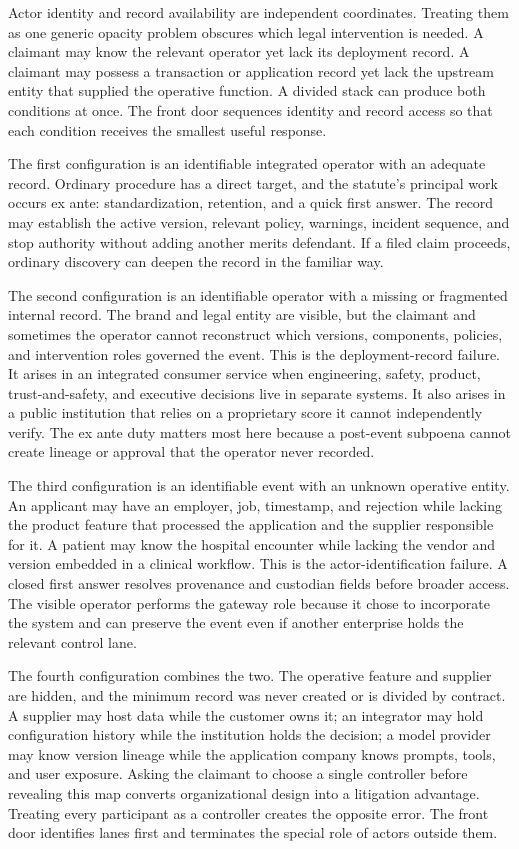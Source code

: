 Actor identity and record availability are independent coordinates. Treating them as one generic opacity problem obscures which legal intervention is needed. A claimant may know the relevant operator yet lack its deployment record. A claimant may possess a transaction or application record yet lack the upstream entity that supplied the operative function. A divided stack can produce both conditions at once. The front door sequences identity and record access so that each condition receives the smallest useful response.

The first configuration is an identifiable integrated operator with an adequate record. Ordinary procedure has a direct target, and the statute's principal work occurs ex ante: standardization, retention, and a quick first answer. The record may establish the active version, relevant policy, warnings, incident sequence, and stop authority without adding another merits defendant. If a filed claim proceeds, ordinary discovery can deepen the record in the familiar way.

The second configuration is an identifiable operator with a missing or fragmented internal record. The brand and legal entity are visible, but the claimant and sometimes the operator cannot reconstruct which versions, components, policies, and intervention roles governed the event. This is the deployment-record failure. It arises in an integrated consumer service when engineering, safety, product, trust-and-safety, and executive decisions live in separate systems. It also arises in a public institution that relies on a proprietary score it cannot independently verify. The ex ante duty matters most here because a post-event subpoena cannot create lineage or approval that the operator never recorded.

The third configuration is an identifiable event with an unknown operative entity. An applicant may have an employer, job, timestamp, and rejection while lacking the product feature that processed the application and the supplier responsible for it. A patient may know the hospital encounter while lacking the vendor and version embedded in a clinical workflow. This is the actor-identification failure. A closed first answer resolves provenance and custodian fields before broader access. The visible operator performs the gateway role because it chose to incorporate the system and can preserve the event even if another enterprise holds the relevant control lane.

The fourth configuration combines the two. The operative feature and supplier are hidden, and the minimum record was never created or is divided by contract. A supplier may host data while the customer owns it; an integrator may hold configuration history while the institution holds the decision; a model provider may know version lineage while the application company knows prompts, tools, and user exposure. Asking the claimant to choose a single controller before revealing this map converts organizational design into a litigation advantage. Treating every participant as a controller creates the opposite error. The front door identifies lanes first and terminates the special role of actors outside them.

